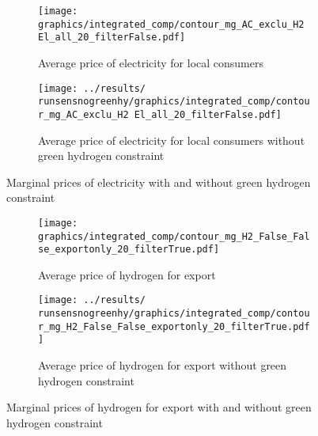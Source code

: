 \begin{figure*}[h!] %
    \centering
    \begin{subfigure}[b]{0.49\linewidth}
        \centering
        \texttt{[image: graphics/integrated\_comp/contour\_mg\_AC\_exclu\_H2 El\_all\_20\_filterFalse.pdf]}
        \caption{Average price of electricity for local consumers}
        \label{fig:local_el_price}
    \end{subfigure}
    \hfill
    \begin{subfigure}[b]{0.49\linewidth}
        \centering
        \texttt{[image: ../results/\\runsensnogreenhy/graphics/integrated\_comp/contour\_mg\_AC\_exclu\_H2 El\_all\_20\_filterFalse.pdf]}
        \caption{Average price of electricity for local consumers without green hydrogen constraint}
        \label{fig:local_el_price_nogreen}
    \end{subfigure}
    \hfill
    \caption{Marginal prices of electricity with and without green hydrogen constraint}
    \label{fig:marginal_prices_el_gh_sens}
\end{figure*}


\begin{figure*}[h!] %
    \centering
    \begin{subfigure}[b]{0.49\linewidth}
        \centering
        \texttt{[image: graphics/integrated\_comp/contour\_mg\_H2\_False\_False\_exportonly\_20\_filterTrue.pdf]}
        \caption{Average price of hydrogen for export}
        \label{fig:local_hy_price}
    \end{subfigure}
    \hfill
    \begin{subfigure}[b]{0.49\linewidth}
        \centering
        \texttt{[image: ../results/\\runsensnogreenhy/graphics/integrated\_comp/contour\_mg\_H2\_False\_False\_exportonly\_20\_filterTrue.pdf]}
        \caption{Average price of hydrogen for export without green hydrogen constraint}
        \label{fig:local_hy_price_nogreen}
    \end{subfigure}
    \hfill
    \caption{Marginal prices of hydrogen for export with and without green hydrogen constraint}
    \label{fig:marginal_prices_hy_gh_sens}
\end{figure*}


\clearpage